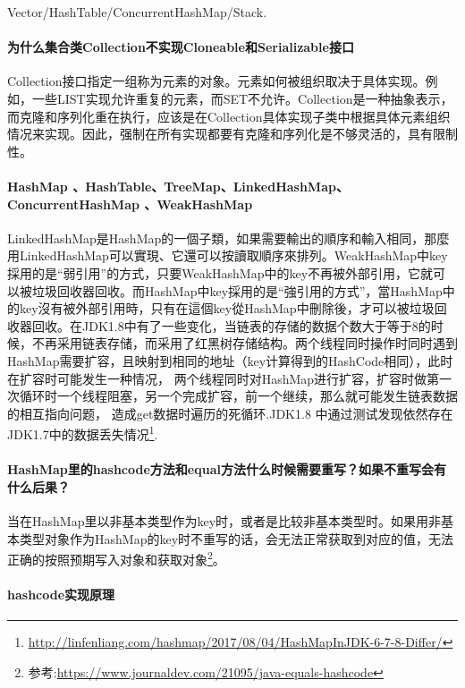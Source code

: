 \documentclass[../../../interview-questions.tex]{subfiles}
\begin{document}
Vector/HashTable/ConcurrentHashMap/Stack.


\paragraph{为什么集合类Collection不实现Cloneable和Serializable接口}

Collection接口指定一组称为元素的对象。元素如何被组织取决于具体实现。例如，一些LIST实现允许重复的元素，而SET不允许。Collection是一种抽象表示，而克隆和序列化重在执行，应该是在Collection具体实现子类中根据具体元素组织情况来实现。因此，强制在所有实现都要有克隆和序列化是不够灵活的，具有限制性。


\paragraph{HashMap 、HashTable、TreeMap、LinkedHashMap、ConcurrentHashMap 、WeakHashMap}

LinkedHashMap是HashMap的一個子類，如果需要輸出的順序和輸入相同，那麼用LinkedHashMap可以實現、它還可以按讀取順序來排列。WeakHashMap中key採用的是“弱引用”的方式，只要WeakHashMap中的key不再被外部引用，它就可以被垃圾回收器回收。而HashMap中key採用的是“強引用的方式”，當HashMap中的key沒有被外部引用時，只有在這個key從HashMap中刪除後，才可以被垃圾回收器回收。在JDK1.8中有了一些变化，当链表的存储的数据个数大于等于8的时候，不再采用链表存储，而采用了红黑树存储结构。两个线程同时操作时同时遇到HashMap需要扩容，且映射到相同的地址（key计算得到的HashCode相同），此时在扩容时可能发生一种情况， 两个线程同时对HashMap进行扩容，扩容时做第一次循环时一个线程阻塞，另一个完成扩容，前一个继续，那么就可能发生链表数据的相互指向问题， 造成get数据时遍历的死循环.JDK1.8 中通过测试发现依然存在JDK1.7中的数据丢失情况\footnote{\url{http://linfenliang.com/hashmap/2017/08/04/HashMapInJDK-6-7-8-Differ/}}.





\paragraph{HashMap里的hashcode方法和equal方法什么时候需要重写？如果不重写会有什么后果？}

当在HashMap里以非基本类型作为key时，或者是比较非基本类型时。如果用非基本类型对象作为HashMap的key时不重写的话，会无法正常获取到对应的值，无法正确的按照预期写入对象和获取对象\footnote{参考:\url{https://www.journaldev.com/21095/java-equals-hashcode}}。

\paragraph{hashcode实现原理}
\end{document}
